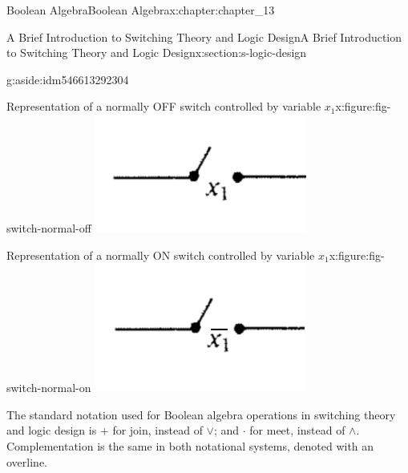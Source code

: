 \documentclass[oneside,10pt,]{book}
\numberwithin{equation}{section}
\begin{document}
\begin{chapterptx}{Boolean Algebra}{}{Boolean Algebra}{}{}{x:chapter:chapter_13}
\begin{sectionptx}{A Brief Introduction to Switching Theory and Logic Design}{}{A Brief Introduction to Switching Theory and Logic Design}{}{}{x:section:s-logic-design}
\begin{aside}{}{g:aside:idm546613292304}
\end{aside}
\begin{sidebyside}{2}{0}{0}{0}%
\begin{sbspanel}{0.5}%
\begin{figureptx}{Representation of a normally OFF switch controlled by variable \(x_1\)}{x:figure:fig-switch-normal-off}{}%
\includegraphics[width=\linewidth]{images/fig-switch-normal-off.png}
\tcblower
\end{figureptx}%
\end{sbspanel}%
\begin{sbspanel}{0.5}%
\begin{figureptx}{Representation of a normally ON switch controlled by variable \(x_1\)}{x:figure:fig-switch-normal-on}{}%
\includegraphics[width=\linewidth]{images/fig-switch-normal-on.png}
\tcblower
\end{figureptx}%
\end{sbspanel}%
\end{sidebyside}%
\par
The standard notation used for Boolean algebra operations in switching theory and logic design is \(+\) for join, instead of \(\lor \); and \(\cdot \) for meet, instead of \(\land \). Complementation is the same in both notational systems, denoted with an overline.%

\end{sectionptx}
\end{chapterptx}
\end{document}
